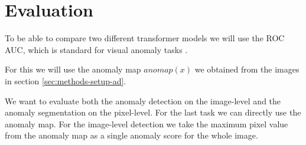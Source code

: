 \section{Evaluation}

To be able to compare two different transformer models we will use the ROC AUC, which is standard for visual anomaly tasks \cite{pirnay_inpainting_2021, zavrtanik_reconstruction_2021, schlegl_unsupervised_2017, li_cutpaste_2021, tsai_autoencoder-based_2021, xie_semisupervised_2021, bergmann_mvtec_2019}.

For this we will use the anomaly map $anomap(x)$ we obtained from the images in section \ref{sec:methods-setup-ad}.

We want to evaluate both the anomaly detection on the image-level and the anomaly segmentation on the pixel-level. For the last task we can directly use the anomaly map. For the image-level detection we take the maximum pixel value from the anomaly map as a single anomaly score for the whole image.